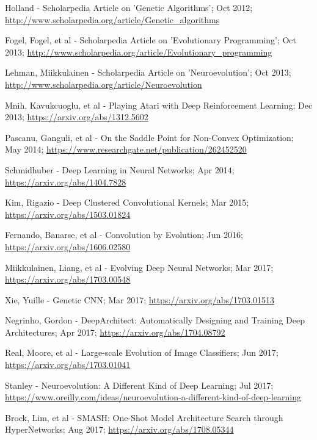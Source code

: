 \documentclass[journal, a4paper]{IEEEtran}
\begin{document}
\begin{thebibliography}{5}
    Holland - Scholarpedia Article on 'Genetic Algorithms'; Oct 2012;
    \url{http://www.scholarpedia.org/article/Genetic_algorithms}

    Fogel, Fogel, et al - Scholarpedia Article on 'Evolutionary Programming'; Oct 2013;
    \url{http://www.scholarpedia.org/article/Evolutionary_programming}

    Lehman, Miikkulainen - Scholarpedia Article on 'Neuroevolution'; Oct 2013;
    \url{http://www.scholarpedia.org/article/Neuroevolution}

    Mnih, Kavukcuoglu, et al - Playing Atari with Deep Reinforcement Learning; Dec 2013;
    \url{https://arxiv.org/abs/1312.5602}

    Pascanu, Ganguli, et al - On the Saddle Point for Non-Convex Optimization; May 2014;
    \url{https://www.researchgate.net/publication/262452520}

    Schmidhuber - Deep Learning in Neural Networks; Apr 2014;
    \url{https://arxiv.org/abs/1404.7828}

    Kim, Rigazio - Deep Clustered Convolutional Kernels; Mar 2015;
    \url{https://arxiv.org/abs/1503.01824}

    Fernando, Banarse, et al - Convolution by Evolution; Jun 2016;
    \url{https://arxiv.org/abs/1606.02580}

    Miikkulainen, Liang, et al - Evolving Deep Neural Networks; Mar 2017;
    \url{https://arxiv.org/abs/1703.00548}

    Xie, Yuille - Genetic CNN; Mar 2017;
    \url{https://arxiv.org/abs/1703.01513}

    Negrinho, Gordon - DeepArchitect: Automatically Designing and Training Deep Architectures; Apr 2017;
    \url{https://arxiv.org/abs/1704.08792}

    Real, Moore, et al - Large-scale Evolution of Image Classifiers; Jun 2017;
    \url{https://arxiv.org/abs/1703.01041}

    Stanley - Neuroevolution: A Different Kind of Deep Learning; Jul 2017;
    \url{https://www.oreilly.com/ideas/neuroevolution-a-different-kind-of-deep-learning}

    Brock, Lim, et al - SMASH: One-Shot Model Architecture Search through HyperNetworks; Aug 2017;
    \url{https://arxiv.org/abs/1708.05344}


\end{thebibliography}
\end{document}
